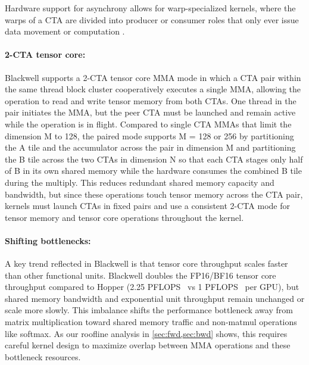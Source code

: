 Hardware support for asynchrony allows for warp-specialized kernels, where the warps of a CTA are divided into producer or consumer roles that only ever issue data movement or computation \citep{warp-specialization-2011}.


\paragraph{2-CTA tensor core:}
Blackwell supports a 2-CTA tensor core MMA mode in which a CTA pair within the same thread block cluster cooperatively executes a single MMA, allowing the operation to read and write tensor memory from both CTAs. One thread in the pair initiates the MMA, but the peer CTA must be launched and remain active while the operation is in flight. Compared to single CTA MMAs that limit the dimension M to 128, the paired mode supports M = 128 or 256 by partitioning the A tile and the accumulator across the pair in dimension M and partitioning the B tile across the two CTAs in dimension N so that each CTA stages only half of B in its own shared memory while the hardware consumes the combined B tile during the multiply. This reduces redundant shared memory capacity and bandwidth, but since these operations touch tensor memory across the CTA pair, kernels must launch CTAs in fixed pairs and use a consistent 2-CTA mode for tensor memory and tensor core operations throughout the kernel.

\paragraph{Shifting bottlenecks:}
A key trend reflected in Blackwell is that tensor core throughput scales faster than other functional units. Blackwell doubles the FP16/BF16 tensor core throughput compared to Hopper (2.25 PFLOPS~\citep{nvidia2024nvidia} vs 1 PFLOPS~\citep{nvidia2022nvidia} per GPU), but shared memory bandwidth and exponential unit throughput remain unchanged or scale more slowly. This imbalance shifts the performance bottleneck away from matrix multiplication toward shared memory traffic and non-matmul operations like softmax. As our roofline analysis in \cref{sec:fwd,sec:bwd} shows, this requires careful kernel design to maximize overlap between MMA operations and these bottleneck resources.

